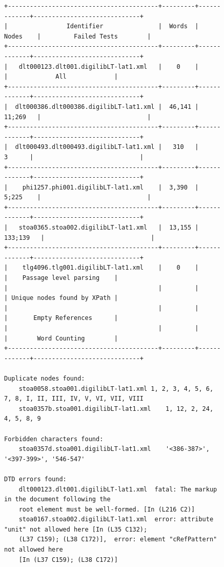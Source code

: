 \begin{figure}
\centering
\begin{adjustbox}{width=.9\linewidth}
\begin{lstlisting}[breaklines=false,columns=fullflexible,keepspaces]
+-----------------------------------------+---------+-------------+-----------------------------+
|                Identifier               |  Words  |    Nodes    |         Failed Tests        |
+-----------------------------------------+---------+-------------+-----------------------------+
|   dlt000123.dlt001.digilibLT-lat1.xml   |    0    |             |             All             |
+-----------------------------------------+---------+-------------+-----------------------------+
|  dlt000386.dlt000386.digilibLT-lat1.xml |  46,141 |    11;269   |                             |
+-----------------------------------------+---------+-------------+-----------------------------+
|  dlt000493.dlt000493.digilibLT-lat1.xml |   310   |      3      |                             |
+-----------------------------------------+---------+-------------+-----------------------------+
|    phi1257.phi001.digilibLT-lat1.xml    |  3,390  |    5;225    |                             |
+-----------------------------------------+---------+-------------+-----------------------------+
|   stoa0365.stoa002.digilibLT-lat1.xml   |  13,155 |   133;139   |                             |
+-----------------------------------------+---------+-------------+-----------------------------+
|    tlg4096.tlg001.digilibLT-lat1.xml    |    0    |             |    Passage level parsing    |
|                                         |         |             | Unique nodes found by XPath |
|                                         |         |             |       Empty References      |
|                                         |         |             |        Word Counting        |
+-----------------------------------------+---------+-------------+-----------------------------+

Duplicate nodes found:
	stoa0058.stoa001.digilibLT-lat1.xml	1, 2, 3, 4, 5, 6, 7, 8, I, II, III, IV, V, VI, VII, VIII
	stoa0357b.stoa001.digilibLT-lat1.xml	1, 12, 2, 24, 4, 5, 8, 9

Forbidden characters found:
	stoa0357d.stoa001.digilibLT-lat1.xml	'<386-387>', '<397-399>', '546-547'

DTD errors found:
	dlt000123.dlt001.digilibLT-lat1.xml	 fatal: The markup in the document following the 
	root element must be well-formed. [In (L216 C2)]
	stoa0167.stoa002.digilibLT-lat1.xml	 error: attribute "unit" not allowed here [In (L35 C132); 
	(L37 C159); (L38 C172)],  error: element "cRefPattern" not allowed here 
	[In (L37 C159); (L38 C172)]


\end{lstlisting}
\end{adjustbox}
\end{figure}
